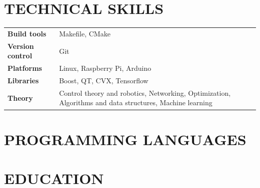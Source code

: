 \documentclass{ResumeTemplate}
\begin{document}
    \raggedright\begin{minipage}[t]{0.69\linewidth} 

        \section{TECHNICAL SKILLS}

        \noindent\begin{tabularx}{\linewidth}{>{\bfseries}lX}
           Build tools     & Makefile, CMake \\
           Version control & Git \\
           Platforms       & Linux, Raspberry Pi, Arduino \\
           Libraries       & Boost, QT, CVX, Tensorflow \\
           Theory          & Control theory and robotics, Networking, Optimization, Algorithms and data structures, Machine learning
        \end{tabularx}
    \end{minipage}
    \hspace{0.01\linewidth}
    \raggedright\begin{minipage}[t]{0.28\linewidth} 
        \section{PROGRAMMING LANGUAGES}


    \end{minipage}

    \section{EDUCATION}
\end{document}
